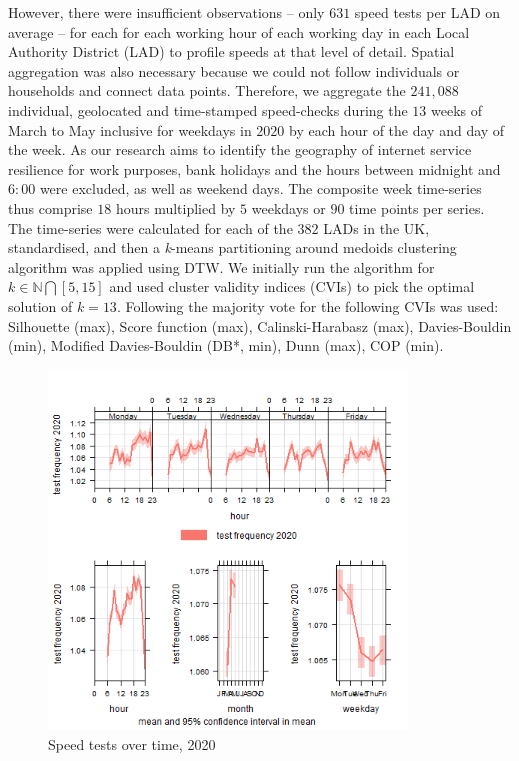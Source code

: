 \documentclass[Royal,times,sageh]{sagej}
\begin{document}
However, there were insufficient observations -- only \(631\) speed
tests per LAD on average -- for each for each working hour of each
working day in each Local Authority District (LAD) to profile speeds at
that level of detail. Spatial aggregation was also necessary because we
could not follow individuals or households and connect data points.
Therefore, we aggregate the \(241,088\) individual, geolocated and
time-stamped speed-checks during the \(13\) weeks of March to May
inclusive for weekdays in \(2020\) by each hour of the day and day of
the week. As our research aims to identify the geography of internet
service resilience for work purposes, bank holidays and the hours
between midnight and \(6:00\) were excluded, as well as weekend days.
The composite week time-series thus comprise \(18\) hours multiplied by
\(5\) weekdays or \(90\) time points per series. The time-series were
calculated for each of the \(382\) LADs in the UK, standardised, and
then a \emph{k}-means partitioning around medoids clustering algorithm
was applied using DTW. We initially run the algorithm for
\(k \in \mathbb{N} \bigcap [5,15]\) and used cluster validity indices
(CVIs) to pick the optimal solution of \(k = 13\). Following
\citet{sardatime} the majority vote for the following CVIs was used:
Silhouette (max), Score function (max), Calinski-Harabasz (max),
Davies-Bouldin (min), Modified Davies-Bouldin (DB*, min), Dunn (max),
COP (min).

\begin{figure}
\centering
\includegraphics[width=0.85\textwidth,height=0.5\textheight]{figures/time.var.plot2020.png}
\caption{Speed tests over time, 2020 \label{test2020}}
\end{figure}
\end{document}

